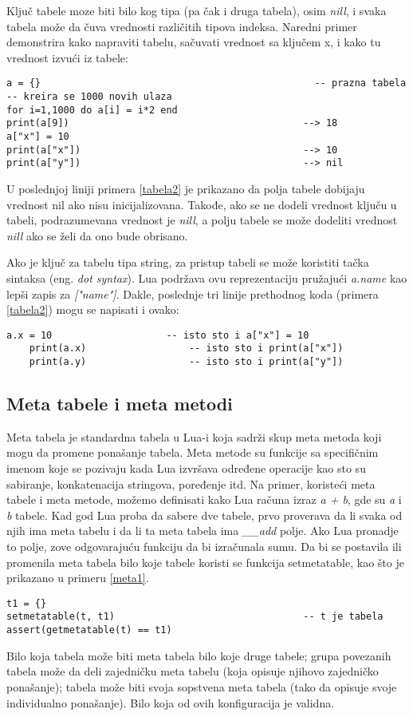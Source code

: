\documentclass[a4paper]{article}
\begin{document}
Ključ tabele moze biti bilo kog tipa (pa čak i druga tabela), osim \textit{nill}, i svaka tabela može da čuva vrednosti različitih tipova indeksa. Naredni primer demonstrira kako napraviti tabelu, sačuvati vrednost sa ključem x, i kako tu vrednost izvući iz tabele:
\begin{lstlisting}[caption={Kreiranje tabele, dodeljivanje i vraćanje vrednosti},frame=single, label=tabela2]
a = {}										          -- prazna tabela
-- kreira se 1000 novih ulaza
for i=1,1000 do a[i] = i*2 end
print(a[9])    										--> 18
a["x"] = 10
print(a["x"])  										--> 10
print(a["y"])  										--> nil
\end{lstlisting}
U poslednjoj liniji primera \ref{tabela2} je prikazano da polja tabele dobijaju vrednost nil ako nisu inicijalizovana. Takođe, ako se ne dodeli vrednost ključu u tabeli, podrazumevana vrednost je \textit{nill}, a polju tabele se može dodeliti vrednost \textit{nill} ako se želi da ono bude obrisano.

Ako je ključ za tabelu tipa string, za pristup tabeli se može koristiti tačka sintaksa (eng. \textit{dot syntax}). Lua podržava ovu reprezentaciju pružajući \textit{a.name} kao lepši zapis za \textit{["name"]}. Dakle, poslednje tri linije prethodnog koda (primera \ref{tabela2}) mogu se napisati i ovako:
\begin{lstlisting}[caption={Primer čuvanja vrednosti u tabeli},frame=single, label=tabela3]
    a.x = 10                    -- isto sto i a["x"] = 10
    print(a.x)                  -- isto sto i print(a["x"])
    print(a.y)                  -- isto sto i print(a["y"])
\end{lstlisting}

\subsection*{Meta tabele i meta metodi}
Meta tabela je standardna tabela u Lua-i koja sadrži skup meta metoda koji mogu da promene ponašanje tabela. Meta metode su funkcije sa specifičnim imenom koje se pozivaju kada Lua izvršava određene operacije kao sto su sabiranje, konkatenacija stringova, poređenje itd. Na primer, koristeći meta tabele i meta metode, možemo definisati kako Lua računa izraz \textit{a + b}, gde su \textit{a} i \textit{b} tabele. Kad god Lua proba da sabere dve tabele, prvo proverava da li svaka od njih ima meta tabelu i da li ta meta tabela ima \textit{\_\_add} polje. Ako Lua pronadje to polje, zove odgovarajuću funkciju da bi izračunala sumu.
Da bi se postavila ili promenila meta tabela bilo koje tabele koristi se funkcija setmetatable, kao što je prikazano u primeru \ref{meta1}.
\begin{lstlisting}[caption={Postavljanje meta-tabele},frame=single, label=meta1]
t1 = {}
setmetatable(t, t1)									-- t je tabela
assert(getmetatable(t) == t1)
\end{lstlisting}
Bilo koja tabela može biti meta tabela bilo koje druge tabele; grupa povezanih tabela može da deli zajedničku meta tabelu (koja opisuje njihovo zajedničko ponašanje); tabela može biti svoja sopstvena meta tabela (tako da opisuje svoje individualno ponašanje). Bilo koja od ovih konfiguracija je validna.
\end{document}
